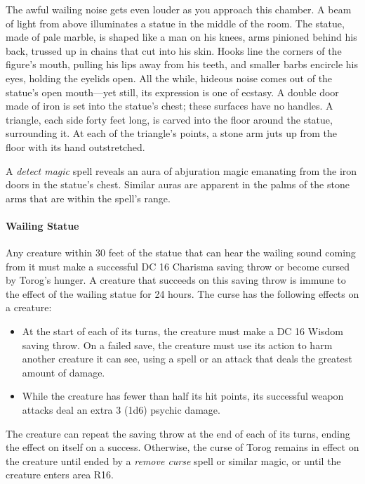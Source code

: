 \documentclass[letterpaper, 11pt, bg=full, twocolumn]{dndbook}
\begin{document}
\begin{DndReadAloud}
The awful wailing noise gets even louder as you approach this chamber. A beam of light from above illuminates a statue in the middle of the room. The statue, made of pale marble, is shaped like a man on his knees, arms pinioned behind his back, trussed up in chains that cut into his skin. Hooks line the corners of the figure's mouth, pulling his lips away from his teeth, and smaller barbs encircle his eyes, holding the eyelids open. All the while, hideous noise comes out of the statue's open mouth---yet still, its expression is one of ecstasy. A double door made of iron is set into the statue's chest; these surfaces have no handles.
A triangle, each side forty feet long, is carved into the floor around the statue, surrounding it. At each of the triangle's points, a stone arm juts up from the floor with its hand outstretched.
\end{DndReadAloud}

A \textit{detect magic} spell reveals an aura of abjuration magic emanating from the iron doors in the statue's chest. Similar auras are apparent in the palms of the stone arms that are within the spell's range.

\paragraph{Wailing Statue}

Any creature within 30 feet of the statue that can hear the wailing sound coming from it must make a successful DC 16 Charisma saving throw or become cursed by Torog's hunger. A creature that succeeds on this saving throw is immune to the effect of the wailing statue for 24 hours. The curse has the following effects on a creature:

\begin{itemize}
\item At the start of each of its turns, the creature must make a DC 16 Wisdom saving throw. On a failed save, the creature must use its action to harm another creature it can see, using a spell or an attack that deals the greatest amount of damage.
\item While the creature has fewer than half its hit points, its successful weapon attacks deal an extra 3 (1d6) psychic damage.
\end{itemize}

The creature can repeat the saving throw at the end of each of its turns, ending the effect on itself on a success. Otherwise, the curse of Torog remains in effect on the creature until ended by a \textit{remove curse} spell or similar magic, or until the creature enters area R16.
\end{document}
